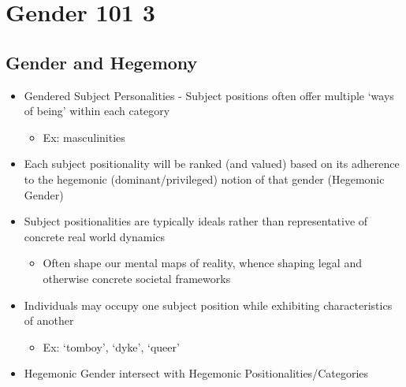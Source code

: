 \documentclass[a4paper]{article}
\begin{document}
\section{Gender 101 3} %
\subsection{Gender and Hegemony}
\begin{itemize}
  \item Gendered Subject Personalities - Subject positions often offer multiple `ways of being' within each category \begin{itemize}
    \item Ex: masculinities
  \end{itemize}
  \item Each subject positionality will be ranked (and valued) based on its adherence to the hegemonic (dominant/privileged) notion of that gender (Hegemonic Gender)
  \item Subject positionalities are typically ideals rather than representative of concrete real world dynamics \begin{itemize}
    \item Often shape our mental maps of reality, whence shaping legal and otherwise concrete societal frameworks
  \end{itemize}
  \item Individuals may occupy one subject position while exhibiting characteristics of another \begin{itemize}
    \item Ex: `tomboy', `dyke', `queer'
  \end{itemize}
  \item Hegemonic Gender intersect with Hegemonic Positionalities/Categories
\end{itemize}
\end{document}
